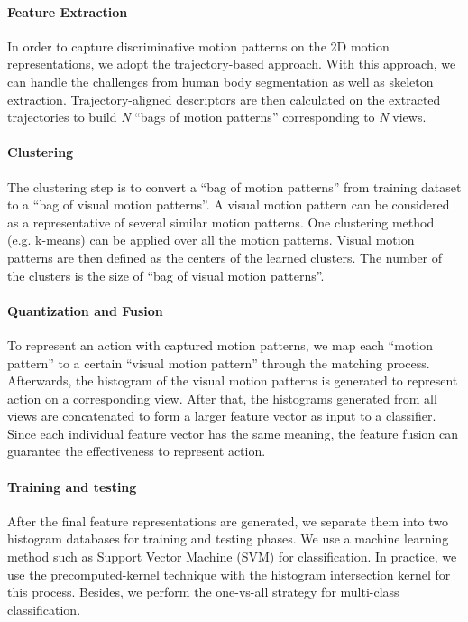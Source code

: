\documentclass[final,3p,times,twocolumn]{elsarticle}
\begin{document}
\paragraph{\textbf{Feature Extraction}}
In order to capture discriminative motion patterns on the 2D motion representations, we adopt the trajectory-based approach.
With this approach, we can handle the challenges from human body segmentation as well as skeleton extraction.
Trajectory-aligned descriptors are then calculated on the extracted trajectories to build \textit{N} ``bags of motion patterns'' corresponding to \textit{N} views.

\paragraph{\textbf{Clustering}}
The clustering step is to convert a ``bag of motion patterns'' from training dataset to a ``bag of visual motion patterns''.
A visual motion pattern can be considered as a representative of several similar motion patterns.
One clustering method (e.g. k-means) can be applied over all the motion patterns.
Visual motion patterns are then defined as the centers of the learned clusters.
The number of the clusters is the size of ``bag of visual motion patterns''.

\paragraph{\textbf{Quantization and Fusion}}
To represent an action with captured motion patterns, we map each ``motion pattern'' to a certain ``visual motion pattern'' through the matching process.
Afterwards, the histogram of the visual motion patterns is generated to represent action on a corresponding view.
After that, the histograms generated from all views are concatenated to form a larger feature vector as input to a classifier.
Since each individual feature vector has the same meaning, the feature fusion can guarantee the effectiveness to represent action.

\paragraph{\textbf{Training and testing}}
After the final feature representations are generated, we separate them into two histogram databases for training and testing phases.
We use a machine learning method such as Support Vector Machine (SVM) for classification.
In practice, we use the precomputed-kernel technique with the histogram intersection kernel for this process.
Besides, we perform the one-vs-all strategy for multi-class classification.
\end{document}
